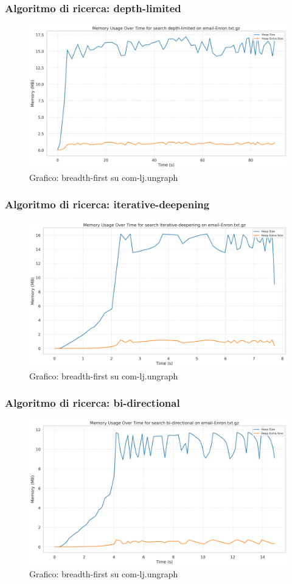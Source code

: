 \documentclass{article}
\begin{document}
\subsubsection{Algoritmo di ricerca: depth-limited}
\begin{figure}[h]\centering
\includegraphics[width=\textwidth]{../plots/email-Enron_depth-limited.png}
\caption{Grafico: breadth-first su com-lj.ungraph}
\end{figure}
\subsubsection{Algoritmo di ricerca: iterative-deepening}
\begin{figure}[h]\centering
\includegraphics[width=\textwidth]{../plots/email-Enron_iterative-deepening.png}
\caption{Grafico: breadth-first su com-lj.ungraph}
\end{figure}
\subsubsection{Algoritmo di ricerca: bi-directional}
\begin{figure}[h]\centering
\includegraphics[width=\textwidth]{../plots/email-Enron_bi-directional.png}
\caption{Grafico: breadth-first su com-lj.ungraph}
\end{figure}
\end{document}
